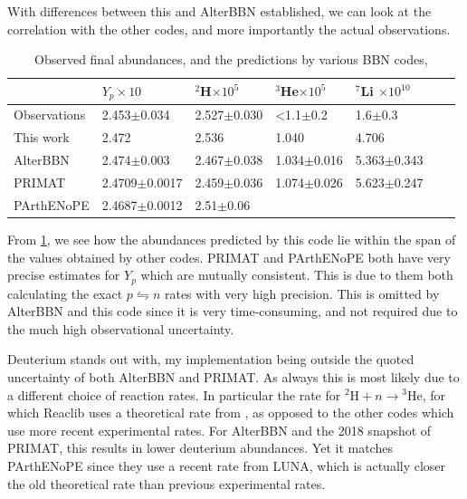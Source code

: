 With differences between this and AlterBBN established, we can look at the correlation with the other codes, and more importantly the actual observations. 
\begin{table}[ht]
    \begin{tabular}{l|llllll}
               & $Y_p \times 10$ & \hspace{-0.34em}$^{2}$H$ \times 10^{5}$ & \hspace{-0.34em}$^{3}$He$ \times 10^{5}$ & \hspace{-0.34em}$^{7}$Li $ \times 10^{10}$\\ \hline
    Observations  & 2.453$\pm$0.034    & 2.527$\pm$0.030 & <1.1$\pm$0.2 & 1.6$\pm$0.3    \\ \hline
    This work  & 2.472            & 2.536 & 1.040 & 4.706    \\ \hline
    AlterBBN & 2.474$\pm$0.003 & 2.467$\pm$0.038 & 1.034$\pm$0.016 & 5.363$\pm$0.343    \\ \hline
    PRIMAT & 2.4709$\pm$0.0017   & 2.459$\pm$0.036 & 1.074$\pm$0.026 & 5.623$\pm$0.247   \\ \hline
    PArthENoPE& 2.4687$\pm$0.0012     & 2.51$\pm$0.06 %
    \end{tabular}
    \caption{Observed final abundances\cite{Yp_Aver_2021}\cite{deuterium_Cooke_2018}\cite{Allobsabun}, and the predictions by various BBN codes\cite{AlterBBN}\cite{PRIMAT}\cite{PArthENoPE},}
    \label{tab:Obsabun}
\end{table}
From \cref{tab:Obsabun}, we see how the abundances predicted by this code lie within the span of the values obtained by other codes. PRIMAT and PArthENoPE both have very precise estimates for $Y_p$ which are mutually consistent. This is due to them both calculating the exact $p\leftrightharpoons n$ rates with very high precision. This is omitted by AlterBBN and this code since it is very time-consuming, and not required due to the much high observational uncertainty. 

Deuterium stands out with, my implementation being outside the quoted uncertainty of both AlterBBN and PRIMAT. As always this is most likely due to a different choice of reaction rates. In particular the rate for ${}^2\text{H}+n\rightarrow {}^3\text{He}$, for which Reaclib uses a theoretical rate from \textcite{Reaclibdphe3_2004}, as opposed to the other codes which use more recent experimental rates. For AlterBBN and the 2018 snapshot of PRIMAT, this results in lower deuterium abundances. Yet it matches PArthENoPE since they use a recent rate from LUNA, which is actually closer the old theoretical rate than previous experimental rates\cite{Luna_impact_Pisanti_2021}. 

